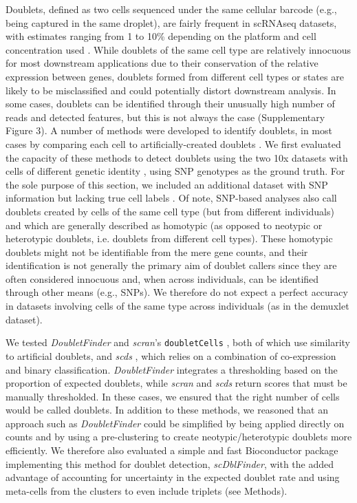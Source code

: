 \documentclass{bmcart}
\begin{document}
Doublets, defined as two cells sequenced under the same cellular barcode (e.g., being captured in the same droplet), are fairly frequent in scRNAseq datasets, with estimates ranging from 1 to 10\% depending on the platform and cell concentration used \cite{bloomEstimating2018,kangMultiplexedDemuxlet2018}. While doublets of the same cell type are relatively innocuous for most downstream applications due to their conservation of the relative expression between genes, doublets formed from different cell types or states are likely to be misclassified and could potentially distort downstream analysis. In some cases, doublets can be identified through their unusually high number of reads and detected features, but this is not always the case (Supplementary Figure 3). A number of methods were developed to identify doublets, in most cases by comparing each cell to artificially-created doublets \cite{mcginnisDoubletfinder2019, LunScran2016, BaisScds2019}. We first evaluated the capacity of these methods to detect doublets using the two 10x datasets with cells of different genetic identity \cite{tianMixology2018}, using SNP genotypes as the ground truth. For the sole purpose of this section, we included an additional dataset with SNP information but lacking true cell labels \cite{kangMultiplexedDemuxlet2018}. Of note, SNP-based analyses also call doublets created by cells of the same cell type (but from different individuals) and which are generally described as homotypic (as opposed to neotypic or heterotypic doublets, i.e. doublets from different cell types). These homotypic doublets might not be identifiable from the mere gene counts, and their identification is not generally the primary aim of doublet callers since they are often considered innocuous and, when across individuals, can be identified through other means (e.g., SNPs). We therefore do not expect a perfect accuracy in datasets involving cells of the same type across individuals (as in the demuxlet dataset).

We tested \textit{DoubletFinder} \cite{mcginnisDoubletfinder2019} and \textit{scran}'s \texttt{doubletCells} \cite{LunScran2016}, both of which use similarity to artificial doublets, and \textit{scds} \cite{BaisScds2019}, which relies on a combination of co-expression and binary classification. \textit{DoubletFinder} integrates a thresholding based on the proportion of expected doublets, while \textit{scran} and \textit{scds} return scores that must be manually thresholded. In these cases, we ensured that the right number of cells would be called doublets. In addition to these methods, we reasoned that an approach such as \textit{DoubletFinder} could be simplified by being applied directly on counts and by using a pre-clustering to create neotypic/heterotypic doublets more efficiently. We therefore also evaluated a simple and fast Bioconductor package implementing this method for doublet detection, \textit{scDblFinder}, with the added advantage of accounting for uncertainty in the expected doublet rate and using meta-cells from the clusters to even include triplets (see Methods).
\end{document}
